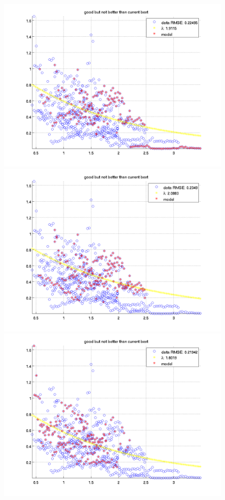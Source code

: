 \documentclass[12pt]{report}
\begin{document}
\begin{figure}[H]
\begin{minipage}[t]{0.5\linewidth}
	\centering
	\includegraphics[scale=\imFeatRan]{images/ransac7}\\
	\includegraphics[scale=\imFeatRan]{images/ransac9}\\
	\includegraphics[scale=\imFeatRan]{images/ransac11}\\

\end{minipage}
\end{figure}
\end{document}
